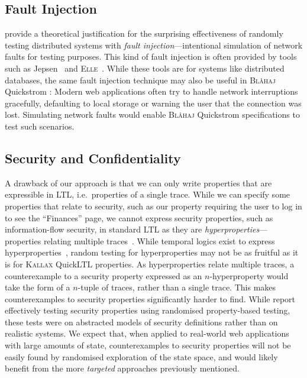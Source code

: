 \documentclass[sigplan,nonacm,10pt]{acmart}
\makeatletter
\newcommand{\Quickstrom}[0]{%
  \if@ACM@anonymous%
  \textsc{Bl\aa{}haj}%
  \else%
  Quickstrom%
  \fi\xspace}
\newcommand{\QuickLTL}[0]{%
    \if@ACM@anonymous%
    \textsc{Kallax}%
    \else%
    QuickLTL%
    \fi\xspace}
\makeatother
\begin{document}
\subsection{Fault Injection} \citet{whyrandom} provide a theoretical justification for the surprising effectiveness of randomly testing
distributed systems with \emph{fault injection}---intentional simulation of network faults for testing purposes. This kind of fault injection is
often provided by tools such as Jepsen~\citep{jepsen} and \textsc{Elle}~\citep{elle}. While these tools are for systems like distributed databases, the same
fault injection technique may also be useful in \Quickstrom: Modern web applications often try to handle network interruptions gracefully, defaulting to local
storage or warning the user that the connection was lost. Simulating network faults would enable \Quickstrom specifications to test such scenarios.



\subsection{Security and Confidentiality} A drawback of our approach is that we can only write properties that are expressible in LTL, i.e.\ properties of a single trace.
While we can specify some properties that relate to security, such as our property requiring the user to log in to see the ``Finances'' page,
we cannot express security properties, such as information-flow security, in standard LTL as they are \emph{hyperproperties}---properties relating multiple traces~\citep{hyperproperties}.
While temporal logics exist to express hyperproperties~\citep{hyperltl,secltl,epistemicltl}, random testing for hyperproperties may not be as fruitful
as it is for \QuickLTL properties. As hyperproperties relate multiple traces,
a counterexample to a security property expressed as an $n$-hyperproperty would take the form of a $n$-tuple of traces, rather than a single trace.
This makes counterexamples to security properties significantly harder to find.
While \citet{qcifc2} report effectively testing security properties using randomised property-based testing, these tests were on abstracted models of security definitions
rather than on realistic systems. We expect that, when applied to real-world web applications with large amounts of state, counterexamples to security properties will not be easily
found by randomised exploration of the state space, and would likely benefit from the more \emph{targeted} approaches previously mentioned.
\end{document}
